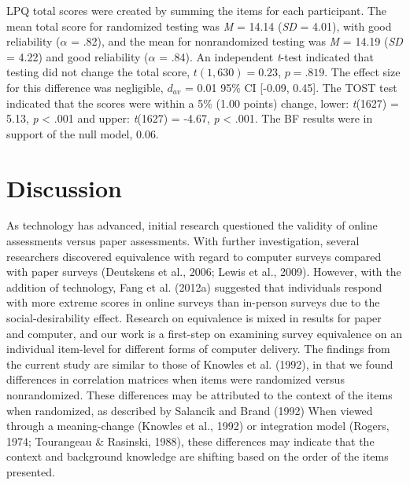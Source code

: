 \documentclass[english,man, mask]{apa6}
\theoremstyle{definition}
\theoremstyle{definition}
\theoremstyle{definition}
\theoremstyle{remark}
\begin{document}
LPQ total scores were created by summing the items for each participant.
The mean total score for randomized testing was \emph{M} = 14.14
(\emph{SD} = 4.01), with good reliability (\(\alpha\) = .82), and the
mean for nonrandomized testing was \emph{M} = 14.19 (\emph{SD} = 4.22)
and good reliability (\(\alpha\) = .84). An independent \emph{t}-test
indicated that testing did not change the total score,
\(t(1,630) = 0.23\), \(p = .819\). The effect size for this difference
was negligible, \(d_{av}\) = 0.01 95\% CI {[}-0.09, 0.45{]}. The TOST
test indicated that the scores were within a 5\% (1.00 points) change,
lower: \emph{t}(1627) = 5.13, \emph{p} \textless{} .001 and upper:
\emph{t}(1627) = -4.67, \emph{p} \textless{} .001. The BF results were
in support of the null model, 0.06.

\section{Discussion}\label{discussion}

As technology has advanced, initial research questioned the validity of
online assessments versus paper assessments. With further investigation,
several researchers discovered equivalence with regard to computer
surveys compared with paper surveys (Deutskens et al., 2006; Lewis et
al., 2009). However, with the addition of technology, Fang et al.
(2012a) suggested that individuals respond with more extreme scores in
online surveys than in-person surveys due to the social-desirability
effect. Research on equivalence is mixed in results for paper and
computer, and our work is a first-step on examining survey equivalence
on an individual item-level for different forms of computer delivery.
The findings from the current study are similar to those of Knowles et
al. (1992), in that we found differences in correlation matrices when
items were randomized versus nonrandomized. These differences may be
attributed to the context of the items when randomized, as described by
Salancik and Brand (1992) When viewed through a meaning-change (Knowles
et al., 1992) or integration model (Rogers, 1974; Tourangeau \&
Rasinski, 1988), these differences may indicate that the context and
background knowledge are shifting based on the order of the items
presented.
\end{document}
